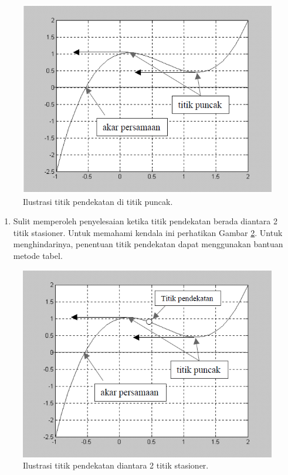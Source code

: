\documentclass[
]{book}
\providecommand{\tightlist}{%
  \setlength{\itemsep}{0pt}\setlength{\parskip}{0pt}}
\theoremstyle{definition}
\theoremstyle{definition}
\theoremstyle{definition}
\theoremstyle{definition}
\theoremstyle{remark}
\begin{document}
\begin{figure}

{\centering \includegraphics[width=0.9\linewidth]{./images/nrviz2} 

}

\caption{Ilustrasi titik pendekatan di titik puncak.}\label{fig:nrviz2}
\end{figure}

\begin{enumerate}
\def\labelenumi{\arabic{enumi}.}
\setcounter{enumi}{1}
\tightlist
\item
  Sulit memperoleh penyelesaian ketika titik pendekatan berada diantara 2 titik stasioner. Untuk memahami kendala ini perhatikan Gambar \ref{fig:nrviz3}. Untuk menghindarinya, penentuan titik pendekatan dapat menggunakan bantuan metode tabel.
\end{enumerate}

\begin{figure}

{\centering \includegraphics[width=0.9\linewidth]{./images/nrviz3} 

}

\caption{Ilustrasi titik pendekatan diantara 2 titik stasioner.}\label{fig:nrviz3}
\end{figure}
\end{document}
